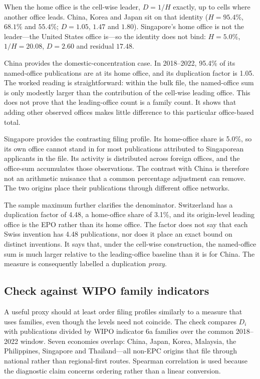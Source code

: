 \documentclass[a4paper,fleqn]{cas-dc}
\begin{document}
When the home office is the cell-wise leader, $D=1/H$ exactly, up to cells
where another office leads. China, Korea and Japan sit on that identity
($H=95.4\%$, $68.1\%$ and $55.4\%$; $D=1.05$, $1.47$ and $1.80$). Singapore's
home office is not the leader---the United States office is---so the identity
does not bind: $H=5.0\%$, $1/H=20.08$, $D=2.60$ and residual $17.48$.

China provides the domestic-concentration case. In 2018--2022, 95.4\% of its
named-office publications are at its home office, and its duplication factor
is 1.05. The worked reading is straightforward: within the bulk file, the
named-office sum is only modestly larger than the contribution of the
cell-wise leading office. This does not prove that the leading-office count is
a family count. It shows that adding other observed offices makes little
difference to this particular office-based total.

Singapore provides the contrasting filing profile. Its home-office share is
5.0\%, so its own office cannot stand in for most publications attributed
to Singaporean applicants in the file. Its activity is distributed across
foreign offices, and the office-sum accumulates those observations. The
contrast with China is therefore not an arithmetic nuisance that a common
percentage adjustment can remove. The two origins place their publications
through different office networks.

The sample maximum further clarifies the denominator. Switzerland has a
duplication factor of 4.48, a home-office share of 3.1\%, and its
origin-level leading office is the EPO rather than its home office. The
factor does not say that each Swiss invention has 4.48 publications, nor does
it place an exact bound on distinct inventions. It says that, under the
cell-wise construction, the named-office sum is much larger relative to the
leading-office baseline than it is for China. The measure is consequently
labelled a duplication \emph{proxy}.

\subsection{Check against WIPO family indicators}\label{sec:check}

A useful proxy should at least order filing profiles similarly to a measure
that uses families, even though the levels need not coincide. The check
compares $D_i$ with publications divided by WIPO indicator 6a families over
the common 2018--2022 window. Seven economies overlap: China, Japan, Korea,
Malaysia, the Philippines, Singapore and Thailand---all non-EPC origins that
file through national rather than regional-first routes. Spearman correlation
is used because the diagnostic claim concerns ordering rather than a linear
conversion.
\end{document}
